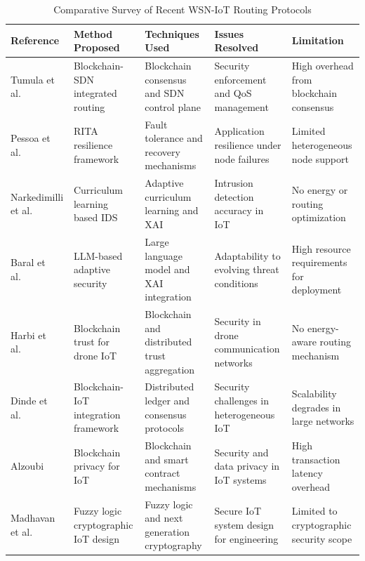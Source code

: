 \documentclass[a4paper,fleqn]{cas-dc}
\numberwithin{equation}{section}
\begin{document}
\begin{table}[htbp]
\centering
\caption{Comparative Survey of Recent WSN-IoT Routing Protocols}
\label{tab:litsurvey}
\begin{tabular}{p{2.4cm} p{3.2cm} p{2.8cm} p{2.8cm} p{2.6cm}}
\toprule
\textbf{Reference} & \textbf{Method Proposed} &
\textbf{Techniques Used} & \textbf{Issues Resolved} &
\textbf{Limitation} \\
\midrule
Tumula et al.~\cite{R9_Tumula2025OptimizingIoTSDNBlockchain}
  & Blockchain-SDN integrated routing
  & Blockchain consensus and SDN control plane
  & Security enforcement and QoS management
  & High overhead from blockchain consensus \\
Pessoa et al.~\cite{R21_Pessoa2024RITAResilientIoT}
  & RITA resilience framework
  & Fault tolerance and recovery mechanisms
  & Application resilience under node failures
  & Limited heterogeneous node support \\
Narkedimilli et al.~\cite{R3_Narkedimilli2025AdaptiveCurriculumIoT}
  & Curriculum learning based IDS
  & Adaptive curriculum learning and XAI
  & Intrusion detection accuracy in IoT
  & No energy or routing optimization \\
Baral et al.~\cite{R7_Baral2024AdaptiveEndToEndIoT}
  & LLM-based adaptive security
  & Large language model and XAI integration
  & Adaptability to evolving threat conditions
  & High resource requirements for deployment \\
Harbi et al.~\cite{Harbi2023BlockchainIoDSecurity}
  & Blockchain trust for drone IoT
  & Blockchain and distributed trust aggregation
  & Security in drone communication networks
  & No energy-aware routing mechanism \\
Dinde et al.~\cite{R10_Dinde2024BlockchainIoTIntegration}
  & Blockchain-IoT integration framework
  & Distributed ledger and consensus protocols
  & Security challenges in heterogeneous IoT
  & Scalability degrades in large networks \\
Alzoubi~\cite{R18_Alzoubi2024BlockchainIoT}
  & Blockchain privacy for IoT
  & Blockchain and smart contract mechanisms
  & Security and data privacy in IoT systems
  & High transaction latency overhead \\
Madhavan et al.~\cite{Madhavan2025DesigningSecureIoT}
  & Fuzzy logic cryptographic IoT design
  & Fuzzy logic and next generation cryptography
  & Secure IoT system design for engineering
  & Limited to cryptographic security scope \\
\bottomrule
\end{tabular}
\end{table}
\end{document}
